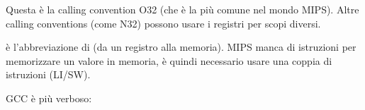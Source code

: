 Questa è la calling convention O32 (che è la più comune nel mondo MIPS).
Altre calling conventions (come N32) possono usare i registri per scopi diversi.


 è l'abbreviazione di  (da un registro alla memoria).
MIPS manca di istruzioni per memorizzare un valore in memoria, è quindi necessario usare una coppia di istruzioni (LI/SW).






\NonOptimizing GCC è più verboso:




